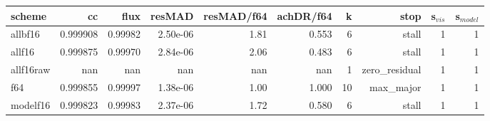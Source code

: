 \begin{tabular}{lrrrrrrrrr}
\toprule
scheme & cc & flux & resMAD & resMAD/f64 & achDR/f64 & k & stop & s$_{vis}$ & s$_{model}$ \\
\midrule
allbf16 & 0.999908 & 0.99982 & 2.50e-06 & 1.81 & 0.553 & 6 & stall & 1 & 1 \\
allf16 & 0.999875 & 0.99970 & 2.84e-06 & 2.06 & 0.483 & 6 & stall & 1 & 1 \\
allf16raw & nan & nan & nan & nan & nan & 1 & zero\_residual & 1 & 1 \\
f64 & 0.999855 & 0.99997 & 1.38e-06 & 1.00 & 1.000 & 10 & max\_major & 1 & 1 \\
modelf16 & 0.999823 & 0.99983 & 2.37e-06 & 1.72 & 0.580 & 6 & stall & 1 & 1 \\
\bottomrule
\end{tabular}